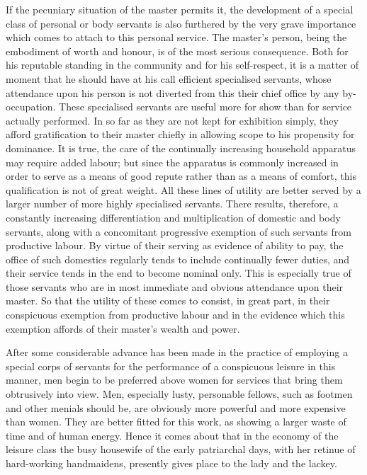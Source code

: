 \documentclass[12pt]{report}
\begin{document}
If the pecuniary situation of the master permits it, the development of
a special class of personal or body servants is also furthered by the
very grave importance which comes to attach to this personal service.
The master's person, being the embodiment of worth and honour, is of
the most serious consequence. Both for his reputable standing in the
community and for his self-respect, it is a matter of moment that he
should have at his call efficient specialised servants, whose attendance
upon his person is not diverted from this their chief office by any
by-occupation. These specialised servants are useful more for show
than for service actually performed. In so far as they are not kept for
exhibition simply, they afford gratification to their master chiefly in
allowing scope to his propensity for dominance. It is true, the care of
the continually increasing household apparatus may require added labour;
but since the apparatus is commonly increased in order to serve as
a means of good repute rather than as a means of comfort, this
qualification is not of great weight. All these lines of utility are
better served by a larger number of more highly specialised servants.
There results, therefore, a constantly increasing differentiation and
multiplication of domestic and body servants, along with a concomitant
progressive exemption of such servants from productive labour. By virtue
of their serving as evidence of ability to pay, the office of such
domestics regularly tends to include continually fewer duties, and their
service tends in the end to become nominal only. This is especially true
of those servants who are in most immediate and obvious attendance upon
their master. So that the utility of these comes to consist, in great
part, in their conspicuous exemption from productive labour and in
the evidence which this exemption affords of their master's wealth and
power.

After some considerable advance has been made in the practice of
employing a special corps of servants for the performance of a
conspicuous leisure in this manner, men begin to be preferred above
women for services that bring them obtrusively into view. Men,
especially lusty, personable fellows, such as footmen and other menials
should be, are obviously more powerful and more expensive than women.
They are better fitted for this work, as showing a larger waste of time
and of human energy. Hence it comes about that in the economy of the
leisure class the busy housewife of the early patriarchal days, with her
retinue of hard-working handmaidens, presently gives place to the lady
and the lackey.
\end{document}

